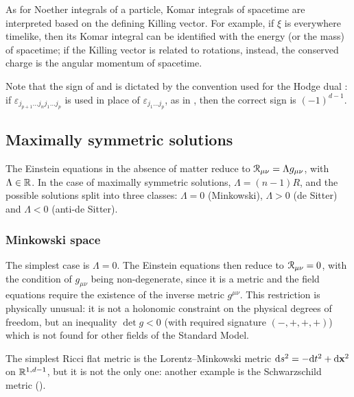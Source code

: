 As for Noether integrals of a particle, Komar integrals of spacetime are interpreted based on the defining Killing vector. For example, if $ \xi $ is everywhere timelike, then its Komar integral can be identified with the energy (or the mass) of spacetime; if the Killing vector is related to rotations, instead, the conserved charge is the angular momentum of spacetime.

Note that the sign of  and  is dictated by the convention used for the Hodge dual : if $ \varepsilon_{j_{p+1} \dots j_n j_1 \dots j_p} $ is used in place of $ \varepsilon_{j_1 \dots j_p} $, as in \cite{ballesteros}, then the correct sign is $ (-1)^{d-1} $.

\subsection{Maximally symmetric solutions}
\label{ssec:maximally-symmetric-solutions}


The Einstein equations in the absence of matter reduce to $ \EuScript{R}_{\mu \nu} = \Lambda g_{\mu \nu} $, with $ \Lambda \in \mathbb{R} $. In the case of maximally symmetric solutions, $ \Lambda = (n-1) R $, and the possible solutions split into three classes: $ \Lambda = 0 $ (Minkowski), $ \Lambda > 0 $ (de Sitter) and $ \Lambda < 0 $ (anti-de Sitter).

\subsubsection{Minkowski space}

The simplest case is $ \Lambda = 0 $. The Einstein equations then reduce to $ \EuScript{R}_{\mu \nu} = 0 $, with the condition of $ g_{\mu \nu} $ being non-degenerate, since it is a metric and the field equations require the existence of the inverse metric $ g^{\mu \nu} $. This restriction is physically unusual: it is not a holonomic constraint on the physical degrees of freedom, but an inequality $ \det g < 0 $ (with required signature $ (-,+,+,+) $) which is not found for other fields of the Standard Model.


The simplest Ricci flat metric is the Lorentz--Minkowski metric $ \mathrm{d} s^2 = -\mathrm{d} t^2 + \mathrm{d} \mathbf{x}^2 $ on $ \mathbb{R}^{1,d-1} $, but it is not the only one: another example is the Schwarzschild metric ().

